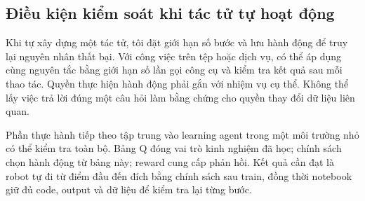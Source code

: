 \subsection{Điều kiện kiểm soát khi tác tử tự hoạt động}
Khi tự xây dựng một tác tử, tôi đặt giới hạn số bước và lưu hành động để truy lại nguyên nhân thất bại. Với công việc trên tệp hoặc dịch vụ, có thể áp dụng cùng nguyên tắc bằng giới hạn số lần gọi công cụ và kiểm tra kết quả sau mỗi thao tác. Quyền thực hiện hành động phải gắn với nhiệm vụ cụ thể. Không thể lấy việc trả lời đúng một câu hỏi làm bằng chứng cho quyền thay đổi dữ liệu liên quan.

Phần thực hành tiếp theo tập trung vào learning agent trong một môi trường nhỏ có thể kiểm tra toàn bộ. Bảng Q đóng vai trò kinh nghiệm đã học; chính sách chọn hành động từ bảng này; reward cung cấp phản hồi. Kết quả cần đạt là robot tự đi từ điểm đầu đến đích bằng chính sách sau train, đồng thời notebook giữ đủ code, output và dữ liệu để kiểm tra lại từng bước.
